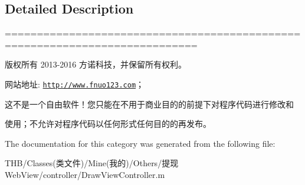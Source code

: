 \subsection{Detailed Description}
============================================================================

版权所有 2013-\/2016 方诺科技，并保留所有权利。

网站地址\+: \href{http://www.fnuo123.com}{\tt http\+://www.\+fnuo123.\+com}； 



这不是一个自由软件！您只能在不用于商业目的的前提下对程序代码进行修改和

使用；不允许对程序代码以任何形式任何目的的再发布。 

 

The documentation for this category was generated from the following file\+:\begin{DoxyCompactItemize}
\item 
T\+H\+B/\+Classes(类文件)/\+Mine(我的)/\+Others/提现\+Web\+View/controller/Draw\+View\+Controller.\+m\end{DoxyCompactItemize}
